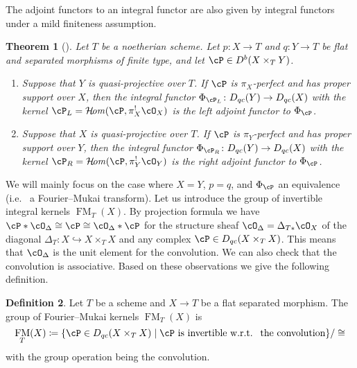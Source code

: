 \documentclass[12pt]{amsart}
\numberwithin{equation}{section}
\theoremstyle{plain}
\newtheorem{theorem}{Theorem}[section]
\theoremstyle{definition}
\newtheorem{definition}[theorem]{Definition}
\DeclareMathOperator{\CHom}{\mathcal{H}\!\mathit{om}}
\DeclareMathOperator{\FM}{\mathrm{FM}}
\begin{document}
The adjoint functors to an integral functor are also given by integral functors under a mild finiteness assumption.
\begin{theorem}[{\cite{MR3720794}}]\label{thm:adjoint-to-integral-functors}
    Let $T$ be a noetherian scheme.
    Let $p \colon X \to T$ and $q \colon Y \to T$ be flat and separated morphisms of finite type, and let $\cP \in D^b(X \times_T Y)$.
    \begin{enumerate}
        \item Suppose that $Y$ is quasi-projective over $T$. If $\cP$ is $\pi_X$-perfect and has proper support over $X$, then the integral functor $\Phi_{\cP_L} \colon D_{qc}(Y) \to D_{qc}(X)$ with the kernel $\cP_L = \CHom(\cP, \pi_X^!\cO_X)$ is the left adjoint functor to $\Phi_{\cP}$.
        \item Suppose that $X$ is quasi-projective over $T$. If $\cP$ is $\pi_Y$-perfect and has proper support over $Y$, then the integral functor $\Phi_{\cP_R} \colon D_{qc}(Y) \to D_{qc}(X)$ with the kernel $\cP_R = \CHom(\cP, \pi_Y^!\cO_Y)$ is the right adjoint functor to $\Phi_{\cP}$.
    \end{enumerate}
\end{theorem}


We will mainly focus on the case where $X = Y$, $p = q$, and $\Phi_{\cP}$ an equivalence (i.e.~ a Fourier--Mukai transform).
Let us introduce the group of invertible integral kernels $\FM_T(X)$.
By projection formula we have $\cP * \cO_{\Delta} \cong \cP \cong \cO_{\Delta} * \cP$ for the structure sheaf $\cO_{\Delta} = \Delta_{T*}\cO_X$ of the diagonal $\Delta_T \colon X \hookrightarrow X \times_T X$ and any complex $\cP \in D_{qc}(X \times_T X)$.
This means that $\cO_{\Delta}$ is the unit element for the convolution.
We can also check that the convolution is associative.
Based on these observations we give the following definition.
\begin{definition}
    Let $T$ be a scheme and $X \to T$ be a flat separated morphism.
    The group of Fourier--Mukai kernels $\FM_T(X)$ is
    \begin{equation}
        \FM_T(X) \coloneqq \{\cP \in D_{qc}(X \times_T X) \mid \text{$\cP$ is invertible w.r.t.~ the convolution}\}/\cong
    \end{equation}
    with the group operation being the convolution.
\end{definition}
\end{document}
